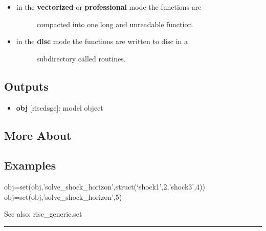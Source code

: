 \documentclass[letterpaper,10pt,english]{sphinxmanual}
\begin{document}
\begin{itemize}
\begin{itemize}
\begin{description}
\begin{itemize}
\begin{description}
\end{description}

\item {} \begin{description}
\item[{in the \textbf{vectorized} or \textbf{professional} mode the functions are}] \leavevmode
compacted into one long and unreadable function.

\end{description}

\item {} \begin{description}
\item[{in the \textbf{disc} mode the functions are written to disc in a}] \leavevmode
subdirectory called routines.

\end{description}

\end{itemize}

\end{description}

\end{itemize}

\end{itemize}


\subsection{Outputs}
\label{classes/models/@dsge/dsge:id181}\begin{itemize}
\item {} 
\textbf{obj} {[}rise\textbar{}dsge{]}: model object

\end{itemize}


\subsection{More About}
\label{classes/models/@dsge/dsge:id182}

\subsection{Examples}
\label{classes/models/@dsge/dsge:id183}
obj=set(obj,'solve\_shock\_horizon',struct(`shock1',2,'shock3',4))
obj=set(obj,'solve\_shock\_horizon',5)

See also: rise\_generic.set


\bigskip\hrule{}\bigskip
\end{document}
